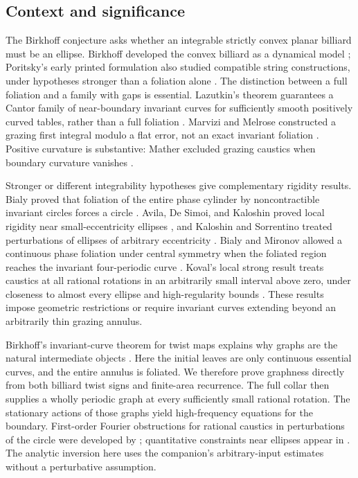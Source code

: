 \subsection{Context and significance}

The Birkhoff conjecture asks whether an integrable strictly convex planar
billiard must be an ellipse. Birkhoff developed the convex billiard as a
dynamical model \citep{Birkhoff1927}; Poritsky's early printed formulation
also studied compatible string constructions, under hypotheses stronger
than a foliation alone \citep{Poritsky1950}. The distinction between a
full foliation and a family with gaps is essential. Lazutkin's theorem
guarantees a Cantor family of near-boundary invariant curves for
sufficiently smooth positively curved tables, rather than a full foliation
\citep{Lazutkin1973}. Marvizi and Melrose constructed a grazing first
integral modulo a flat error, not an exact invariant foliation
\citep{MarviziMelrose1982}. Positive curvature is substantive: Mather
excluded grazing caustics when boundary curvature vanishes
\citep{Mather1982}.

Stronger or different integrability hypotheses give complementary
rigidity results. Bialy proved that foliation of the entire phase
cylinder by noncontractible invariant circles forces a circle
\citep{Bialy1993}. Avila, De Simoi, and Kaloshin proved local rigidity
near small-eccentricity ellipses \citep{ADK2016}, and Kaloshin and
Sorrentino treated perturbations of ellipses of arbitrary eccentricity
\citep{KS2018}. Bialy and Mironov allowed a continuous phase foliation
under central symmetry when the foliated region reaches the invariant
four-periodic curve \citep{BialyMironov2022}. Koval's local strong
result treats caustics at all rational rotations in an arbitrarily small
interval above zero, under closeness to almost every ellipse and
high-regularity bounds
\citep{Koval2026}. These results impose geometric restrictions or require
invariant curves extending beyond an arbitrarily thin grazing annulus.

Birkhoff's invariant-curve theorem for twist maps explains why graphs are
the natural intermediate objects \citep{Arnaud2009}. Here the initial
leaves are only continuous essential curves, and the entire annulus is
foliated. We therefore prove graphness directly from both billiard twist
signs and finite-area recurrence. The full collar then supplies a wholly
periodic graph at every sufficiently small rational rotation. The
stationary actions of those graphs yield high-frequency equations for the
boundary. First-order Fourier obstructions for rational caustics in
perturbations of the circle were developed by \citet{RamirezRos2006};
quantitative constraints near ellipses appear in \citet{ADK2016}.
The analytic inversion here uses the companion's arbitrary-input estimates
without a perturbative assumption.

